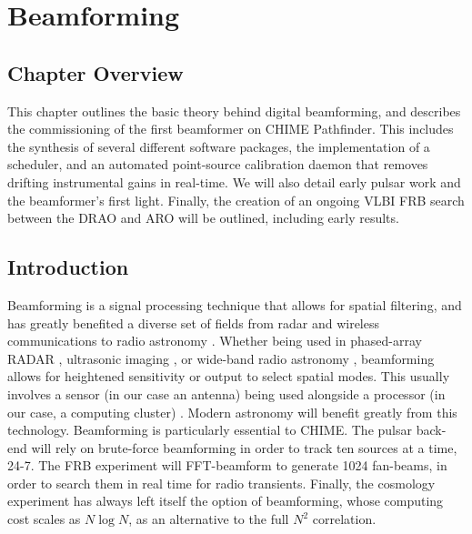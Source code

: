 \chapter{Beamforming}
\label{chapter:beamforming}




\section{Chapter Overview}

This chapter outlines the basic theory behind 
digital beamforming, and describes the commissioning 
of the first beamformer on CHIME Pathfinder. This 
includes the synthesis of several different software packages, 
the implementation of a scheduler, 
and an automated point-source calibration daemon that 
removes drifting instrumental gains in real-time. We will 
also detail early pulsar work and the beamformer's first light. 
Finally, the creation of an ongoing VLBI FRB search between 
the DRAO and ARO will be outlined, including early results. 

\section{Introduction}

Beamforming is a signal processing technique that allows for 
spatial filtering, and has greatly benefited a diverse set of fields 
from radar and wireless communications to radio astronomy 
\citep{1988IASSP...5....4V}. Whether being used in phased-array RADAR
\citep{2007BAMS...88.1753Z}, 
ultrasonic imaging \citep{macovski1983medical}, or 
wide-band radio astronomy \citep{2013PASA...30....7T}, beamforming 
allows for heightened sensitivity or output to select spatial
modes. This usually involves a sensor (in our case an antenna)
being used alongside a processor (in our case, a computing cluster) 
\citep{1988IASSP...5....4V}. Modern astronomy will benefit greatly from this
technology. 
Beamforming is particularly essential to CHIME. 
The pulsar back-end will rely on
brute-force beamforming in order to track ten sources at a time, 24-7.  
The FRB experiment will FFT-beamform to generate 1024 fan-beams, 
in order to search them in real time for radio transients. Finally, the cosmology 
experiment has always left itself the option of beamforming, whose 
computing cost scales as $N\log N$, as 
an alternative to the full $N^2$ correlation.
  
